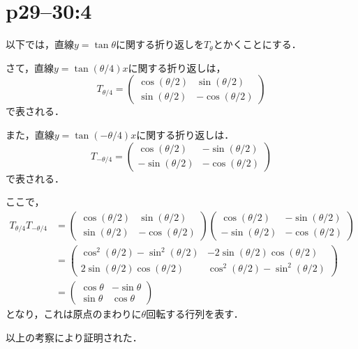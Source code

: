 \section*{p29--30:4}

\begin{tproof}
  以下では，直線$y= \tan \theta$に関する折り返しを$T_{\theta}$とかくことにする．

  さて，直線$ y = \tan (\theta /4) x$に関する折り返しは，
  \[
    T_{\theta/4} = \begin{pmatrix} \cos (\theta /2) & \sin (\theta /2) \\  \sin (\theta /2) & -\cos (\theta /2) \end{pmatrix}
  \]
  で表される．

  また，直線$y = \tan (-\theta /4)x$に関する折り返しは．
  \[
    T_{-\theta/4} = \begin{pmatrix} \cos (\theta /2) & -\sin (\theta/2) \\ -\sin (\theta/2) & -\cos (\theta /2) \end{pmatrix}
  \]
  で表される．

  ここで，
  \begin{align*}
    T_{\theta/4} T_{-\theta/4} & = \begin{pmatrix} \cos (\theta /2) & \sin (\theta /2) \\  \sin (\theta /2) & -\cos (\theta /2) \end{pmatrix} \begin{pmatrix} \cos (\theta /2) & -\sin (\theta/2) \\ -\sin (\theta/2) & -\cos (\theta /2) \end{pmatrix} \\
                               & =\begin{pmatrix} \cos ^2 (\theta /2)-\sin ^2 (\theta/2) & -2\sin (\theta/2) \cos (\theta/2) \\ 2\sin (\theta/2) \cos (\theta/2) & \cos ^2 (\theta/2)-\sin ^2 (\theta/2) \end{pmatrix}                                  \\
                               & = \begin{pmatrix} \cos \theta & -\sin \theta \\ \sin \theta & \cos \theta \end{pmatrix}
  \end{align*}
  となり，これは原点のまわりに$\theta$回転する行列を表す．

  以上の考察により証明された．
\end{tproof}

